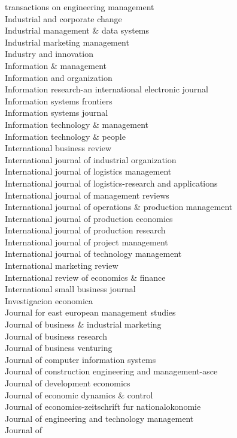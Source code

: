 \documentclass[a4paper]{article}
\begin{document}
\begin{footnotesize}
transactions on engineering management \\ Industrial and corporate change \\ Industrial management \& data systems \\ Industrial marketing management \\ Industry and innovation \\ Information \& management \\ Information and organization \\ Information research-an international electronic journal \\ Information systems frontiers \\ Information systems journal \\ Information technology \& management \\ Information technology \& people \\ International business review \\ International journal of industrial organization \\ International journal of logistics management \\ International journal of logistics-research and applications \\ International journal of management reviews \\ International journal of operations \& production management \\ International journal of production economics \\ International journal of production research \\ International journal of project management \\ International journal of technology management \\ International marketing review \\ International review of economics \& finance \\ International small business journal \\ Investigacion economica \\ Journal for east european management studies \\ Journal of business \& industrial marketing \\ Journal of business research \\ Journal of business venturing \\ Journal of computer information systems \\ Journal of construction engineering and management-asce \\ Journal of development economics \\ Journal of economic dynamics \& control \\ Journal of economics-zeitschrift fur nationalokonomie \\ Journal of engineering and technology management \\ Journal of 
\end{footnotesize}
\end{document}
